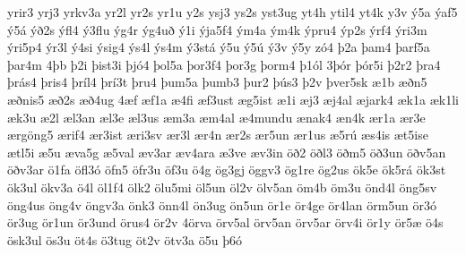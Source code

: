 {yrir3
yrj3
yrkv3a
yr2l
yr2s
yr1u
y2s
ysj3
ys2s
yst3ug
yt4h
ytil4
yt4k
y3v
ý5a
ýaf5
ý5á
ýð2s
ýfl4
ý3flu
ýg4r
ýg4uð
ý1i
ýja5f4
ým4a
ým4k
ýpru4
ýp2s
ýrf4
ýri3m
ýri5p4
ýr3l
ý4si
ýsig4
ýs4l
ýs4m
ý3stá
ý5u
ý5ú
ý3v
ý5y
zó4
þ2a
þam4
þarf5a
þar4m
4þb
þ2i
þist3i
þjó4
þol5a
þor3f4
þor3g
þorm4
þ1ól
3þór
þór5i
þ2r2
þra4
þrás4
þris4
þríl4
þrí3t
þru4
þum5a
þumb3
þur2
þús3
þ2v
þver5sk
æ1b
æðn5
æðnis5
æð2s
æð4ug
4æf
æf1a
æ4fi
æf3ust
æg5ist
æ1i
æj3
æj4al
æjark4
æk1a
æk1li
æk3u
æ2l
æl3an
æl3e
æl3us
æm3a
æm4al
æ4mundu
ænak4
æn4k
ær1a
ær3e
ærgöng5
ærif4
ær3ist
æri3sv
ær3l
ær4n
ær2s
ær5un
ær1us
æ5rú
æs4is
æt5ise
ætl5i
æ5u
æva5g
æ5val
æv3ar
æv4ara
æ3ve
æv3in
öð2
öðl3
öðm5
öð3un
öðv5an
öðv3ar
ö1fa
öfl3ó
öfn5
öfr3u
öf3u
ö4g
ög3gj
öggv3
ög1re
ög2us
ök5e
ök5rá
ök3st
ök3ul
ökv3a
ö4l
öl1f4
ölk2
ölu5mi
öl5un
öl2v
ölv5an
öm4b
öm3u
önd4l
öng5sv
öng4us
öng4v
öngv3a
önk3
önn4l
ön3ug
ön5un
ör1e
ör4ge
ör4lan
örm5un
ör3ó
ör3ug
ör1un
ör3und
örus4
ör2v
4örva
örv5al
örv5an
örv5ar
örv4i
ör1y
ör5æ
ö4s
ösk3ul
ös3u
öt4s
ö3tug
öt2v
ötv3a
ö5u
þ6ó
}
